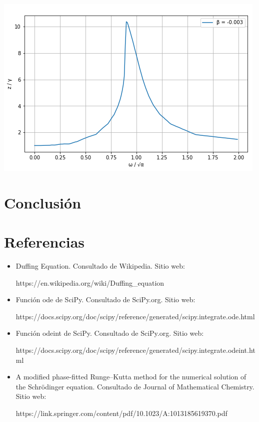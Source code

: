 \documentclass{article}
\begin{document}
\begin{center}
    \includegraphics[scale = 0.4]{003.png}
\end{center}

\section{Conclusión}


\section{Referencias}
\begin{itemize}
    \item Duffing Equation. Consultado de Wikipedia. Sitio web:
    
    https://en.wikipedia.org/wiki/Duffing\_equation
    
    \item Función ode de SciPy. Consultado de SciPy.org. Sitio web:
    
    https://docs.scipy.org/doc/scipy/reference/generated/scipy.integrate.ode.html
    
    \item Función odeint de SciPy. Consultado de SciPy.org. Sitio web:
    
    https://docs.scipy.org/doc/scipy/reference/generated/scipy.integrate.odeint.html
    
    \item A modified phase-fitted Runge–Kutta method for the numerical solution of the Schrödinger equation. Consultado de Journal of Mathematical Chemistry. Sitio web:
    
    https://link.springer.com/content/pdf/10.1023/A:1013185619370.pdf
\end{itemize}
\end{document}
